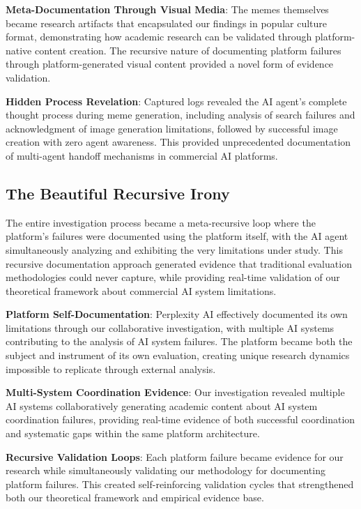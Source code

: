 \documentclass[12pt]{article}
\begin{document}
\textbf{Meta-Documentation Through Visual Media}: The memes themselves became research artifacts that encapsulated our findings in popular culture format, demonstrating how academic research can be validated through platform-native content creation. The recursive nature of documenting platform failures through platform-generated visual content provided a novel form of evidence validation.

\textbf{Hidden Process Revelation}: Captured logs revealed the AI agent's complete thought process during meme generation, including analysis of search failures and acknowledgment of image generation limitations, followed by successful image creation with zero agent awareness. This provided unprecedented documentation of multi-agent handoff mechanisms in commercial AI platforms.

\subsection{The Beautiful Recursive Irony}

The entire investigation process became a meta-recursive loop where the platform's failures were documented using the platform itself, with the AI agent simultaneously analyzing and exhibiting the very limitations under study. This recursive documentation approach generated evidence that traditional evaluation methodologies could never capture, while providing real-time validation of our theoretical framework about commercial AI system limitations.

\textbf{Platform Self-Documentation}: Perplexity AI effectively documented its own limitations through our collaborative investigation, with multiple AI systems contributing to the analysis of AI system failures. The platform became both the subject and instrument of its own evaluation, creating unique research dynamics impossible to replicate through external analysis.

\textbf{Multi-System Coordination Evidence}: Our investigation revealed multiple AI systems collaboratively generating academic content about AI system coordination failures, providing real-time evidence of both successful coordination and systematic gaps within the same platform architecture.

\textbf{Recursive Validation Loops}: Each platform failure became evidence for our research while simultaneously validating our methodology for documenting platform failures. This created self-reinforcing validation cycles that strengthened both our theoretical framework and empirical evidence base.
\end{document}
